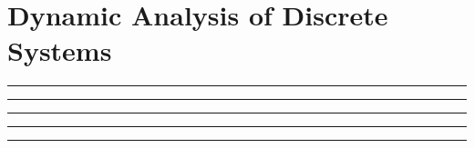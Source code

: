 \setcounter{chapter}{7}
\setcounter{section}{1}
\section{Dynamic Analysis of Discrete Systems}
\vspace{-8pt} \hrule \hrule \hrule \hrule \hrule  \vspace{12pt}